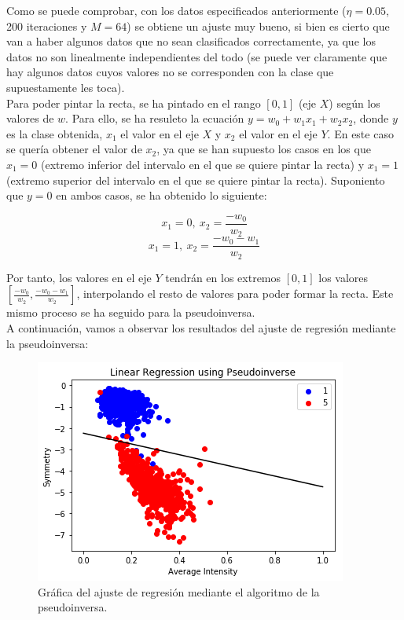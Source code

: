 \documentclass[11pt,a4paper]{article}
\begin{document}
Como se puede comprobar, con los datos especificados anteriormente ($\eta = 0.05$, 200 iteraciones y $M = 64$) se obtiene
un ajuste muy bueno, si bien es cierto que van a haber algunos datos que no sean clasificados correctamente, ya que los
datos no son linealmente independientes del todo (se puede ver claramente que hay algunos datos cuyos valores no se
corresponden con la clase que supuestamente les toca).\\

Para poder pintar la recta, se ha pintado en el rango $[0, 1]$ (eje $X$) según los valores de $w$. Para ello, se ha
resuleto la ecuación $y = w_0 + w_1 x_1 + w_2 x_2$, donde $y$ es la clase obtenida, $x_1$ el valor en el eje $X$ y $x_2$ el
valor en el eje $Y$. En este caso se quería obtener el valor de $x_2$, ya que se han supuesto los casos en los que $x_1 = 0$
(extremo inferior del intervalo en el que se quiere pintar la recta) y $x_1 = 1$ (extremo superior del intervalo en el que se
quiere pintar la recta). Suponiento que $y = 0$ en ambos casos, se ha obtenido lo siguiente:

\[x_1 = 0, \: x_2 = \frac{-w_0}{w_2} \]
\[x_1 = 1, \: x_2 = \frac{-w_0 - w_1}{w_2} \]

Por tanto, los valores en el eje $Y$ tendrán en los extremos $[0, 1]$ los valores $[\frac{-w_0}{w_2}, \frac{-w_0 - w_1}{w_2}]$,
interpolando el resto de valores para poder formar la recta. Este mismo proceso se ha seguido para la pseudoinversa.\\

A continuación, vamos a observar los resultados del ajuste de regresión mediante la pseudoinversa:

\begin{figure}[H]
\centering
\includegraphics[scale=0.8]{img/pinv_regression.png}
\caption{Gráfica del ajuste de regresión mediante el algoritmo de la pseudoinversa.}
\end{figure}
\end{document}
